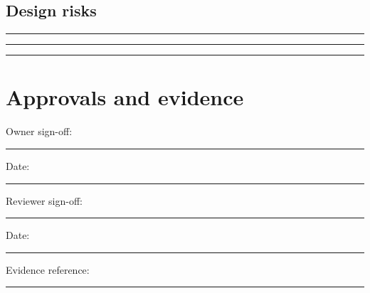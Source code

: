 \documentclass[11pt]{article}
\begin{document}
\subsection{Design risks}
\noindent\rule{\linewidth}{0.3pt}\par\vspace{0.18in}
\noindent\rule{\linewidth}{0.3pt}\par\vspace{0.18in}
\noindent\rule{\linewidth}{0.3pt}\par\vspace{0.14in}

\section{Approvals and evidence}
\noindent Owner sign-off: \rule{0.42\linewidth}{0.4pt}\hfill Date: \rule{0.19\linewidth}{0.4pt}\par\vspace{0.4cm}
\noindent Reviewer sign-off: \rule{0.40\linewidth}{0.4pt}\hfill Date: \rule{0.19\linewidth}{0.4pt}\par\vspace{0.4cm}
\noindent Evidence reference: \rule{0.70\linewidth}{0.4pt}
\end{document}

